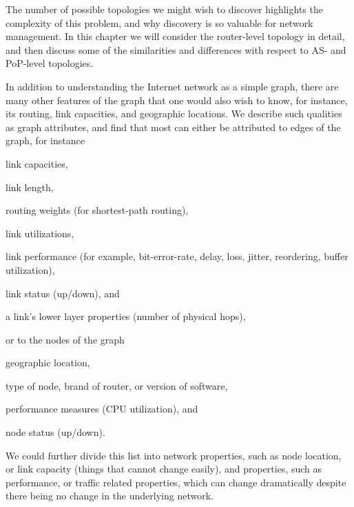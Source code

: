 \begin{enumerate}

\end{enumerate}
The number of possible topologies we might wish to discover highlights
the complexity of this problem, and why discovery is so valuable for
network management. In this chapter we will consider the router-level
topology in detail, and then discuss some of the similarities and
differences with respect to AS- and PoP-level topologies.

In addition to understanding the Internet network as a simple graph,
there are many other features of the graph that one would also wish to
know, for instance, its routing, link capacities, and geographic
locations. We describe such qualities as graph attributes, and find
that most can either be attributed to edges of the graph, for instance
\begin{sitemize} 

  \item link capacities,

  \item link length,
 
  \item routing weights (\eg for shortest-path routing),

  \item link utilizations,

  \item link performance (for example, bit-error-rate, delay, loss,
  jitter, reordering, buffer utilization), 

  \item link status (up/down), and 

  \item a link's lower layer properties (\eg number of physical hops),

\end{sitemize}
or to the nodes of the graph
\begin{sitemize}

  \item geographic location,

  \item type of node, \eg brand of router, or version of software,

  \item performance measures (\eg CPU utilization), and 

  \item node status (up/down).

\end{sitemize}
We could further divide this list into  network
properties, such as node location, or link capacity (things that
cannot change easily), and  properties, such as
performance, or traffic related properties, which can change
dramatically despite there being no change in the underlying network.

